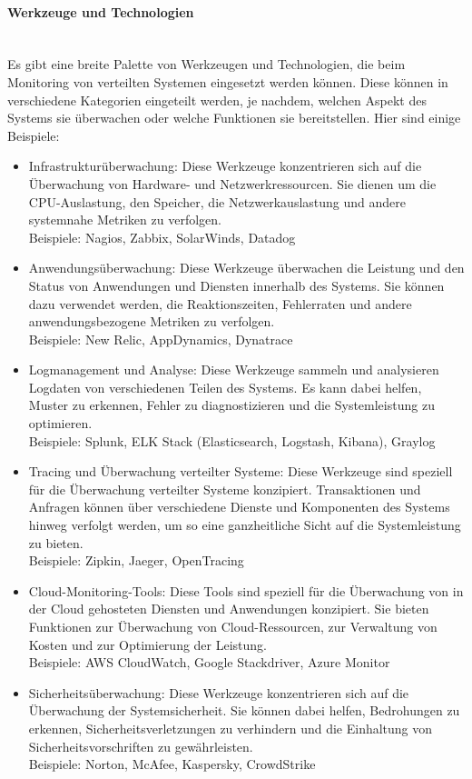 \documentclass[../vs-script-first-v01.tex]{subfiles}
\begin{document}
\paragraph{Werkzeuge und Technologien\\\\}
Es gibt eine breite Palette von Werkzeugen und Technologien, die beim Monitoring von verteilten Systemen eingesetzt werden können. Diese können in verschiedene Kategorien eingeteilt werden, je nachdem, welchen Aspekt des Systems sie überwachen oder welche Funktionen sie bereitstellen. Hier sind einige Beispiele:
\begin{itemize}
\item Infrastrukturüberwachung: Diese Werkzeuge konzentrieren sich auf die Überwachung von Hardware- und Netzwerkressourcen. Sie dienen um die CPU-Auslastung, den Speicher, die Netzwerkauslastung und andere systemnahe Metriken zu verfolgen.\\
Beispiele: Nagios, Zabbix, SolarWinds, Datadog
\item Anwendungsüberwachung: Diese Werkzeuge überwachen die Leistung und den Status von Anwendungen und Diensten innerhalb des Systems. Sie können dazu verwendet werden, die Reaktionszeiten, Fehlerraten und andere anwendungsbezogene Metriken zu verfolgen.\\
Beispiele: New Relic, AppDynamics, Dynatrace
\item Logmanagement und Analyse: Diese Werkzeuge sammeln und analysieren Logdaten von verschiedenen Teilen des Systems. Es kann dabei helfen, Muster zu erkennen, Fehler zu diagnostizieren und die Systemleistung zu optimieren.\\
Beispiele: Splunk, ELK Stack (Elasticsearch, Logstash, Kibana), Graylog
\item Tracing und Überwachung verteilter Systeme: Diese Werkzeuge sind speziell für die Überwachung verteilter Systeme konzipiert. Transaktionen und Anfragen können über verschiedene Dienste und Komponenten des Systems hinweg verfolgt werden, um so eine ganzheitliche Sicht auf die Systemleistung zu bieten.\\
Beispiele: Zipkin, Jaeger, OpenTracing
\item Cloud-Monitoring-Tools: Diese Tools sind speziell für die Überwachung von in der Cloud gehosteten Diensten und Anwendungen konzipiert. Sie bieten Funktionen zur Überwachung von Cloud-Ressourcen, zur Verwaltung von Kosten und zur Optimierung der Leistung.\\
Beispiele: AWS CloudWatch, Google Stackdriver, Azure Monitor
\item Sicherheitsüberwachung: Diese Werkzeuge konzentrieren sich auf die Überwachung der Systemsicherheit. Sie können dabei helfen, Bedrohungen zu erkennen, Sicherheitsverletzungen zu verhindern und die Einhaltung von Sicherheitsvorschriften zu gewährleisten.\\
Beispiele: Norton, McAfee, Kaspersky, CrowdStrike
\end{itemize}
\end{document}
